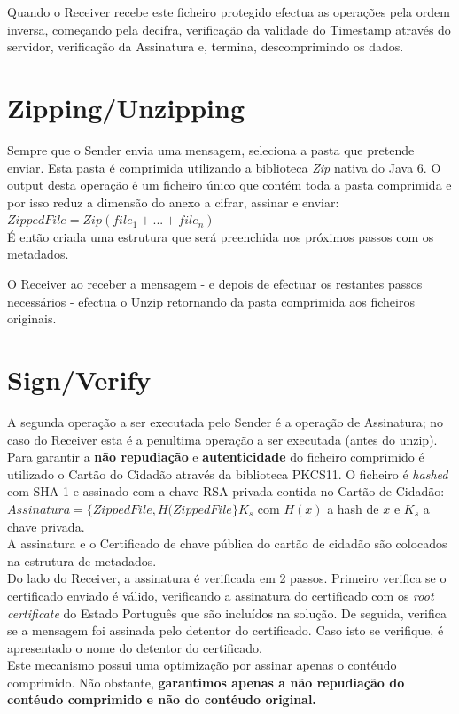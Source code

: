 Quando o Receiver recebe este ficheiro protegido efectua as operações pela ordem inversa, começando pela decifra, verificação da validade do Timestamp através do servidor, verificação da Assinatura e, termina, descomprimindo os dados.

\section{Zipping/Unzipping}
Sempre que o Sender envia uma mensagem, seleciona a pasta que pretende enviar. Esta pasta é comprimida utilizando a biblioteca \textit{Zip} nativa do Java 6. O output desta operação é um ficheiro único que contém toda a pasta comprimida e por isso reduz a dimensão do anexo a cifrar, assinar e enviar: $Zipped File = Zip(file_1+ ... +file_n)$ \\
É então criada uma estrutura que será preenchida nos próximos passos com os metadados. 

O Receiver ao receber a mensagem - e depois de efectuar os restantes passos necessários - efectua o Unzip retornando da pasta comprimida aos ficheiros originais.

\section{Sign/Verify}
A segunda operação a ser executada pelo Sender é a operação de Assinatura; no caso do Receiver esta é a penultima operação a ser executada (antes do unzip). \\
Para garantir a \textbf{não repudiação} e \textbf{autenticidade} do ficheiro comprimido é utilizado o Cartão do Cidadão através da biblioteca PKCS11. O ficheiro é \textit{hashed} com SHA-1 e assinado com a chave RSA privada contida no Cartão de Cidadão: $Assinatura = \{ZippedFile, H(ZippedFile\}K_s$ com $H(x)$ a hash de $x$ e $K_s$ a chave privada. \\ A assinatura e o Certificado de chave pública do cartão de cidadão são colocados na estrutura de metadados. \\

Do lado do Receiver, a assinatura é verificada em 2 passos. Primeiro verifica se o certificado enviado é válido, verificando a assinatura do certificado com os \textit{root certificate} do Estado Português que são incluídos na solução. De seguida, verifica se a mensagem foi assinada pelo detentor do certificado. Caso isto se verifique, é apresentado o nome do detentor do certificado.\\
Este mecanismo possui uma optimização por assinar apenas o contéudo comprimido. Não obstante,\textbf{ garantimos apenas a não repudiação do contéudo comprimido e não do contéudo original.} 

